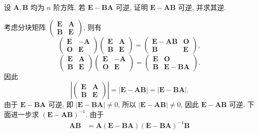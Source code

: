 \documentclass[../../main.tex]{subfiles}
\begin{document}
\begin{example}
设 \(\boldsymbol{A}, \boldsymbol{B}\) 均为 \(n\) 阶方阵. 若 \(\boldsymbol{E} - \boldsymbol{BA}\) 可逆, 证明 \(\boldsymbol{E} - \boldsymbol{AB}\) 可逆, 并求其逆.
\end{example}
\begin{solution}
考虑分块矩阵 \(\begin{pmatrix} \boldsymbol{E} & \boldsymbol{A} \\ \boldsymbol{B} & \boldsymbol{E} \end{pmatrix}\), 则有
\[
\begin{pmatrix} \boldsymbol{E} & -\boldsymbol{A} \\ \boldsymbol{O} & \boldsymbol{E} \end{pmatrix} \begin{pmatrix} \boldsymbol{E} & \boldsymbol{A} \\ \boldsymbol{B} & \boldsymbol{E} \end{pmatrix} = \begin{pmatrix} \boldsymbol{E} - \boldsymbol{AB} & \boldsymbol{O} \\ \boldsymbol{B} & \boldsymbol{E} \end{pmatrix},
\]
\[
\begin{pmatrix} \boldsymbol{E} & \boldsymbol{A} \\ \boldsymbol{B} & \boldsymbol{E} \end{pmatrix} \begin{pmatrix} \boldsymbol{E} & -\boldsymbol{A} \\ \boldsymbol{O} & \boldsymbol{E} \end{pmatrix} = \begin{pmatrix} \boldsymbol{E} & \boldsymbol{O} \\ \boldsymbol{B} & \boldsymbol{E} - \boldsymbol{BA} \end{pmatrix}.
\]
因此
\[
\left| \begin{pmatrix} \boldsymbol{E} & \boldsymbol{A} \\ \boldsymbol{B} & \boldsymbol{E} \end{pmatrix} \right| = |\boldsymbol{E} - \boldsymbol{AB}| = |\boldsymbol{E} - \boldsymbol{BA}|.
\]
由于 \(\boldsymbol{E} - \boldsymbol{BA}\) 可逆, 即 \(|\boldsymbol{E} - \boldsymbol{BA}| \neq 0\), 所以 \(|\boldsymbol{E} - \boldsymbol{AB}| \neq 0\), 因此 \(\boldsymbol{E} - \boldsymbol{AB}\) 可逆. 下面进一步求 \((\boldsymbol{E} - \boldsymbol{AB})^{-1}\). 由于
\[
\begin{aligned}
\boldsymbol{AB} &= \boldsymbol{A}(\boldsymbol{E} - \boldsymbol{BA})(\boldsymbol{E} - \boldsymbol{BA})^{-1}\boldsymbol{B} \\

\end{aligned}\]
\end{solution}
\end{document}
